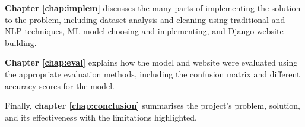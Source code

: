 \documentclass{l4proj}
\begin{document}
\textbf{Chapter \ref{chap:implem}} discusses the many parts of implementing the solution to the problem, including dataset analysis and cleaning using traditional and NLP techniques, ML model choosing and implementing, and Django website building.

\textbf{Chapter \ref{chap:eval}} explains how the model and website were evaluated using the appropriate evaluation methods, including the confusion matrix and different accuracy scores for the model.

Finally, \textbf{chapter \ref{chap:conclusion}} summarises the project's problem, solution, and its effectiveness with the limitations highlighted.








\end{document}
